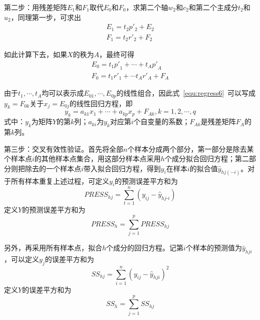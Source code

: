 第二步：用残差矩阵$E_1$和$F_1$取代$E_0$和$F_0$，求第二个轴$w_2$和$c_2$和第二个主成分$t_2$和$u_2$，同理第一步，可求出
\begin{align}
    \label{equ:regress3}
    E_1={t_2}{p'_2}+E_2 \\
    \label{equ:regress4}
    F_1={t_2}{r'_2}+F_2
\end{align}

如此计算下去，如果$X$的秩为$A$，最终可得
\begin{align}
    \label{equ:regress5}
    {{E}_{0}}={{t}_{1}}{{{p}'}_{1}}+\cdots +{{t}_{A}}{{{p}'}_{A}} \\
    \label{equ:regress6}
    {{F}_{0}}={{t}_{1}}{{{r}'}_{1}}+\cdots {{t}_{A}}{{{r}'}_{A}}+{{F}_{A}}
\end{align}

由于$t_1,\cdots ,t_A$均可以表示成${E}_{01},\cdots ,{E}_{0p}$的线性组合，因此式~\ref{equ:regress6}~可以写成$y_k=F_{0k}$关于$x_j=E_{0j}$的线性回归方程，即
\begin{equation}
    \label{equ:regress7}
    {{y}_{k}}={{a}_{k1}}{{x}_{1}}+\cdots +{{a}_{kp}}{{x}_{p}}+{{F}_{Ak}},k=1,2,\cdots ,q
\end{equation}
式中：$y_k$为矩阵$Y$的第$k$列；$a_{ki}$为$y_k$对应第$i$个自变量的系数；${F}_{Ak}$是残差矩阵$F_A$的第$k$列。

第三步：交叉有效性验证。首先将全部$n$个样本分成两个部分，第一部分是除去某个样本点$i$的其他样本点集合，用这部分样本点采用$h$个成分拟合回归方程；第二部分则把除去的一个样本点$i$带入拟合回归方程，得到$y_i$在样本$i$的拟合值${{\hat{y}}_{hj(-i)}}$。对于所有样本重复上述过程，可定义$y_i$的预测误差平方和为
\begin{equation}
    \label{equ:press}
    PRES{{S}_{hj}}=\sum\limits_{t=1}^{n}{\left( {{y}_{ij}}-{{{\hat{y}}}_{hj\text{-}i}} \right)}
\end{equation}
定义$Y$的预测误差平方和为
\begin{equation}
    {{PRESS}_{h}}=\sum\limits_{j=1}^{p}{{{PRESS}_{hj}}}
\end{equation}

另外，再采用所有样本点，拟合$h$个成分的回归方程。记第$i$个样本的预测值为${{\hat{y}}_{hji}}$，可以定义$y_j$的误差平方和为
\begin{equation}
    S{{S}_{hj}}=\sum\limits_{i=1}^{n}{{{\left( {{y}_{ij}}-\hat{y}_{hji} \right)}^{2}}}
\end{equation}
定义$Y$的误差平方和为
\begin{equation}
    S{{S}_{h}}=\sum\limits_{j=1}^{p}{S{{S}_{hj}}}
\end{equation}

